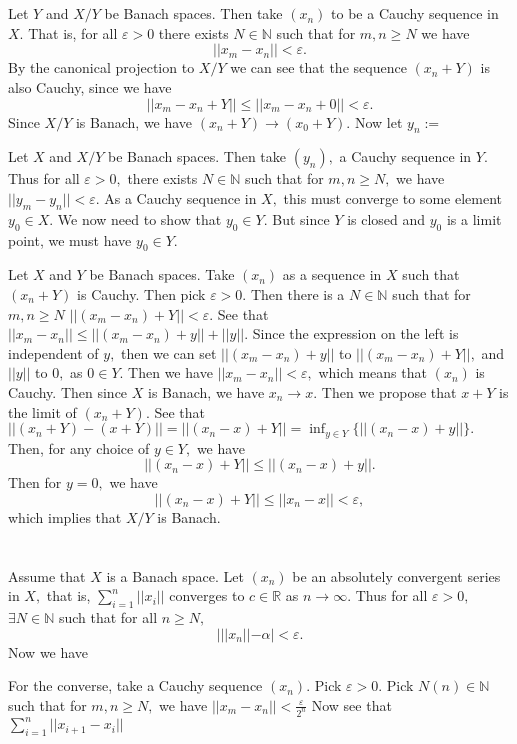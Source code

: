 \documentclass{article}
\begin{document}
\section{} %
Let $Y$ and $X/Y$ be Banach spaces. Then take $(x_n)$ to be a Cauchy sequence in $X.$ That is, for all $\varepsilon > 0$ there exists $N \in \mathbb{N}$ 
such that for $m,n \geq N$ we have $$||x_m-x_n||< \varepsilon.$$
By the canonical projection to $X/Y$ we can see that the sequence $(x_n+Y)$ is also Cauchy, since we have $$||x_m-x_n +Y|| \leq ||x_m-x_n+0|| < \varepsilon. 
$$ Since $X/Y$ is Banach, we have $(x_n+Y) \to (x_0+Y).$ Now let $y_n:= $ 

Let $X$ and $X/Y$ be Banach spaces. Then take $(y_n),$ a Cauchy sequence in $Y.$ Thus for all $\varepsilon > 0,$ there exists $N \in \mathbb{N}$ such that 
for $m,n \geq N,$ we have $||y_m-y_n||< \varepsilon.$ As a Cauchy sequence in $X,$ this must converge to some element $y_0 \in X.$ We now need to show that 
$y_0 \in Y.$ But since $Y$ is closed and $y_0$ is a limit point, we must have $y_0 \in Y.$

Let $X$ and $Y$ be Banach spaces. Take $(x_n)$ as a sequence in $X$ such that $(x_n+Y)$ is Cauchy. Then pick $\varepsilon>0.$ Then there is a $N \in 
\mathbb{N}$ such that for $m,n \geq N$ $||(x_m-x_n)+Y|| < \varepsilon.$ See that $||x_m-x_n|| \leq ||(x_m-x_n)+y||+||y||.$ Since the expression on the left 
is independent of $y,$ then we can set $||(x_m-x_n)+y||$ to $||(x_m-x_n)+Y||,$ and $||y||$ to $0,$ as $0 \in Y.$ Then we have $||x_m-x_n|| < \varepsilon,$ 
which means that $(x_n)$ is Cauchy. Then since $X$ is Banach, we have $x_n \to x.$ Then we propose that $x + Y$ is the limit of $(x_n+Y).$ See that 
$||(x_n+Y)-(x+Y)|| = || (x_n-x)+Y || = \inf_{y \in Y} \{||(x_n-x)+y|| \}.$ Then, for any choice of $y \in Y,$ we have $$ || (x_n-x)+Y || \leq || (x_n-x)+y 
||.$$ Then for $y=0,$ we have $$|| (x_n-x)+Y || \leq ||x_n-x|| < \varepsilon,$$ which implies that $X/Y$ is Banach. 
\section{} %
Assume that $X$ is a Banach space. Let $(x_n)$ be an absolutely convergent series in $X,$ that is, $\sum_{i=1}^n||x_i||$ converges to $c \in \mathbb{R}$ as 
$n \to \infty.$ Thus  
for all $\varepsilon > 0,$ $\exists N \in \mathbb{N}$ such that for all $n \geq N,$ $$| ||x_n|| - \alpha| < \varepsilon.$$
Now we have $ $

For the converse, take a Cauchy sequence $(x_n).$ Pick $\varepsilon>0.$ Pick $N(n) \in \mathbb{N}$ such that for $m,n \geq N,$ we have $ ||x_{m}-x_n ||< 
\frac{\varepsilon}{2^n}$ Now see that $\sum_{i=1}^n ||x_{i+1}-x_i||$ 
\end{document}
